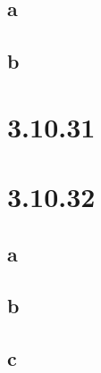 \documentclass[12pt]{article}
\begin{document}
\subsection{a}

\subsection{b}

\section{3.10.31}

\section{3.10.32}

\subsection{a}

\subsection{b}

\subsection{c}
\end{document}
